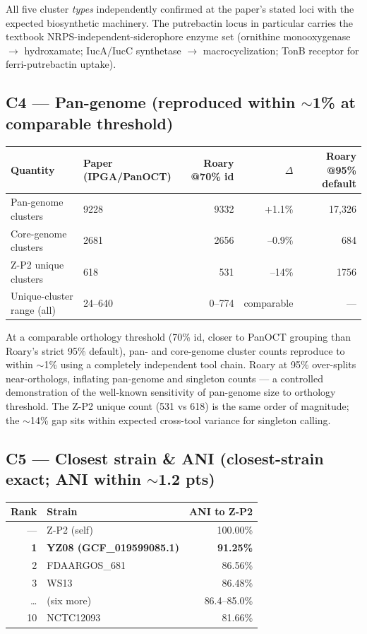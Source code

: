 \documentclass[11pt]{article}
\begin{document}
All five cluster \emph{types} independently confirmed at the paper's stated loci with the expected biosynthetic machinery. The putrebactin locus in particular carries the textbook NRPS-independent-siderophore enzyme set (ornithine monooxygenase $\rightarrow$ hydroxamate; IucA/IucC synthetase $\rightarrow$ macrocyclization; TonB receptor for ferri-putrebactin uptake).

\subsection{C4 --- Pan-genome (reproduced within $\sim$1\% at comparable threshold)}
\begin{tabular}{@{}llrrr@{}}
\toprule
Quantity & Paper (IPGA/PanOCT) & Roary @70\% id & $\Delta$ & Roary @95\% default \\ \midrule
Pan-genome clusters & 9228 & 9332 & +1.1\% & 17{,}326 \\
Core-genome clusters & 2681 & 2656 & --0.9\% & 684 \\
Z-P2 unique clusters & 618 & 531 & --14\% & 1756 \\
Unique-cluster range (all) & 24--640 & 0--774 & comparable & --- \\
\bottomrule
\end{tabular}

At a comparable orthology threshold (70\% id, closer to PanOCT grouping than Roary's strict 95\% default), pan- and core-genome cluster counts reproduce to within $\sim$1\% using a completely independent tool chain. Roary at 95\% over-splits near-orthologs, inflating pan-genome and singleton counts --- a controlled demonstration of the well-known sensitivity of pan-genome size to orthology threshold. The Z-P2 unique count (531 vs 618) is the same order of magnitude; the $\sim$14\% gap sits within expected cross-tool variance for singleton calling.

\subsection{C5 --- Closest strain \& ANI (closest-strain exact; ANI within $\sim$1.2 pts)}
\begin{tabular}{@{}rlr@{}}
\toprule
Rank & Strain & ANI to Z-P2 \\ \midrule
--- & Z-P2 (self) & 100.00\% \\
\textbf{1} & \textbf{YZ08 (GCF\_019599085.1)} & \textbf{91.25\%} \\
2 & FDAARGOS\_681 & 86.56\% \\
3 & WS13 & 86.48\% \\
\ldots & (six more) & 86.4--85.0\% \\
10 & NCTC12093 & 81.66\% \\
\bottomrule
\end{tabular}
\end{document}

